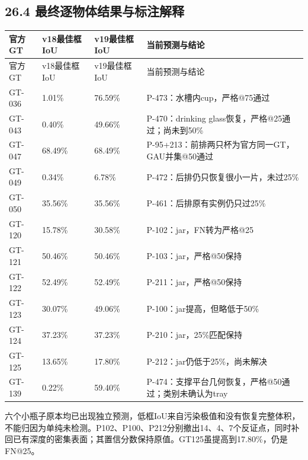 \documentclass[UTF8,fontset=fandol]{ctexart}
\begin{document}
\subsection*{26.4 最终逐物体结果与标注解释}

{\small
\begin{longtable}{|p{}|p{}|p{}|p{}|}
\hline
官方GT & v18最佳框IoU & v19最佳框IoU & 当前预测与结论 \\ \hline
\endfirsthead
\hline
官方GT & v18最佳框IoU & v19最佳框IoU & 当前预测与结论 \\ \hline
\endhead
GT-036 & 1.01\% & 76.59\% & P-473：水槽内cup，严格@75通过 \\ \hline
GT-043 & 0.40\% & 49.66\% & P-470：drinking glass恢复，严格@25通过；尚未到50\% \\ \hline
GT-047 & 68.49\% & 68.49\% & P-95+213：前排两只杯为官方同一GT，GAU并集@50通过 \\ \hline
GT-049 & 0.34\% & 6.78\% & P-472：后排仍只恢复很小一片，未过25\% \\ \hline
GT-050 & 35.56\% & 35.56\% & P-461：后排原有实例仍只过25\% \\ \hline
GT-120 & 15.78\% & 30.58\% & P-102：jar，FN转为严格@25 \\ \hline
GT-121 & 50.46\% & 50.46\% & P-103：jar，严格@50保持 \\ \hline
GT-122 & 52.49\% & 52.49\% & P-211：jar，严格@50保持 \\ \hline
GT-123 & 30.07\% & 49.06\% & P-100：jar提高，但略低于50\% \\ \hline
GT-124 & 37.23\% & 37.23\% & P-210：jar，25\%匹配保持 \\ \hline
GT-125 & 13.65\% & 17.80\% & P-212：jar仍低于25\%，尚未解决 \\ \hline
GT-139 & 0.22\% & 59.40\% & P-474：支撑平台几何恢复，严格@50通过；类别未确认为tray \\ \hline
\end{longtable}
}

六个小瓶子原本均已出现独立预测，低框IoU来自污染极值和没有恢复完整体积，不能归因为单纯未检测。P102、P100、P212分别撤出14、4、7个反证点，同时补回已有深度的密集表面；其置信分数保持原值。GT125虽提高到17.80\%，仍是FN@25。
\end{document}
